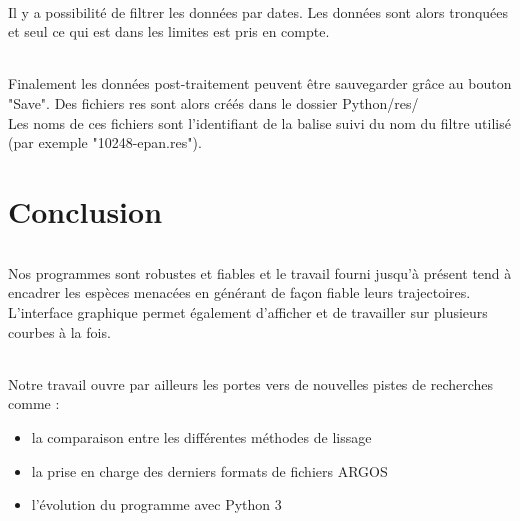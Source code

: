 \documentclass[11p, a4papert]{article}
\begin{document}
\paragraph{}
Il y a possibilité de filtrer les données par dates. Les données sont alors tronquées et seul ce qui est dans les limites est pris en compte.

\paragraph{}
Finalement les données post-traitement peuvent être sauvegarder grâce au bouton "Save". Des fichiers res sont alors créés dans le dossier Python/res/ \\
Les noms de ces fichiers sont l'identifiant de la balise suivi du nom du filtre utilisé (par exemple "10248-epan.res").

\newpage
\part{Conclusion}

\paragraph{}
Nos programmes sont robustes et fiables et le travail fourni jusqu'à présent tend à encadrer les espèces menacées en générant de façon fiable leurs trajectoires.
\newline
L'interface graphique permet également d'afficher et de travailler sur plusieurs courbes à la fois.
\paragraph{}
Notre travail ouvre par ailleurs les portes vers de nouvelles pistes de recherches comme :
\begin{itemize}
\item la comparaison entre les différentes méthodes de lissage
\item la prise en charge des derniers formats de fichiers ARGOS
\item l'évolution du programme avec Python 3
\end{itemize}
\end{document}
